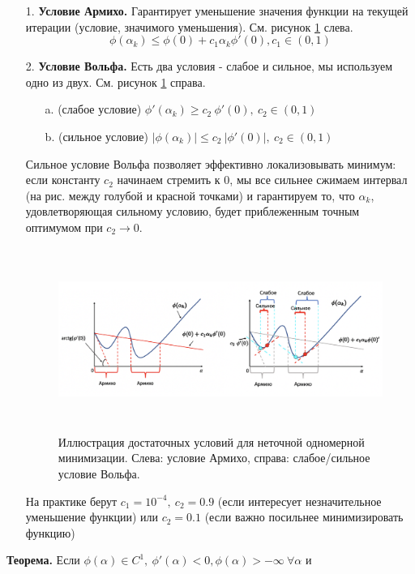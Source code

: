 \begin{itemize}
    \item[1.] \textbf{Условие Армихо.}
    Гарантирует уменьшение значения функции на текущей итерации (условие, значимого уменьшения). См. рисунок \ref{ris:im225} слева.
    $$\phi(\alpha_k) \leq \phi(0) + c_1 \alpha_k \phi'(0), c_1 \in (0,1) $$

    \item[2.] \textbf{Условие Вольфа.} Есть два условия - слабое и сильное, мы используем одно из двух. См. рисунок \ref{ris:im225} справа. \newline
    \begin{itemize}
        \item[a.] (слабое условие) $\phi'(\alpha_k)\geq c_2 \ \phi'(0), \ c_2 \in (0,1)$
        \item[b.] (сильное условие) $|\phi(\alpha_k)|\leq c_2 \ |\phi'(0)|, \ c_2 \in (0,1)$
    \end{itemize}
    Сильное условие Вольфа позволяет эффективно локализовывать минимум: если константу $c_2$ начинаем стремить к 0, мы все сильнее сжимаем интервал (на рис. между голубой и красной точками) и гарантируем то, что $\alpha_k$, удовлетворяющая сильному условию, будет приблеженным точным оптимумом при $c_2 \to 0$.
    \begin{figure}[hbt!]
        \centering
        \includegraphics[width=16cm, height=6cm]{images/im225.png}
        \caption{Иллюстрация достаточных условий для неточной одномерной минимизации. Слева: условие Армихо, справа: слабое/сильное условие Вольфа.}
        \label{ris:im225}
    \end{figure}
    \newline
    На практике берут $c_1=10^{-4}, \ c_2 = 0.9$ (если интересует незначительное уменьшение функции) или $c_2=0.1$ (если важно посильнее минимизировать функцию)
\end{itemize}
\textbf{Теорема.}
Если $\phi(\alpha)\in C^1, \ \phi'(\alpha)<0, \phi(\alpha)>-\infty \ \forall \alpha$ и
